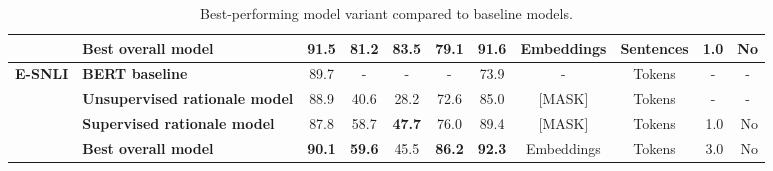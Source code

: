 \begin{table*}[]
\begin{tabular}{@{}llccccccccc@{}}
                                  & \textbf{Best overall model}                         & \textbf{91.5}                  & \textbf{81.2}                  & \textbf{83.5}                  & \textbf{79.1}                  & \textbf{91.6}                                                                                  & Embeddings                           & Sentences                                & \multicolumn{1}{r}{1.0}                                               & \multicolumn{1}{r}{No}                                                    \\ \midrule
\multirow{4}{*}{\textbf{E-SNLI}}  & \textbf{BERT baseline}                              & 89.7                           & \multicolumn{1}{c}{-} & \multicolumn{1}{c}{-} & \multicolumn{1}{c}{-} & 73.9                                                                                  & \multicolumn{1}{c}{-}                & Tokens                                   & -                                                                     & -                                                                         \\
                                  & \textbf{Unsupervised rationale model}                      & 88.9                           & 40.6                  & 28.2                  & 72.6                  & 85.0                                                                                  & [MASK]                               & Tokens                                   & -                                                                     & -                                                                         \\
                                  & \textbf{Supervised rationale model}                        & 87.8                           & 58.7                  & \textbf{47.7}                  & 76.0                  & 89.4                                                                                  & [MASK]                               & Tokens                                   & \multicolumn{1}{r}{1.0}                                               & \multicolumn{1}{r}{No}                                                    \\
                                  & \textbf{Best overall model}                         & \textbf{90.1}                           & \textbf{59.6}                  & 45.5                  & \textbf{86.2}                  & \textbf{92.3}                                                                                  & Embeddings                           & Tokens                                   & \multicolumn{1}{r}{3.0}                                               & \multicolumn{1}{r}{No}                                                    \\ \bottomrule
\end{tabular}
\caption{Best-performing model variant compared to baseline models. 
}
\label{tab:baseline_results}
\end{table*}



